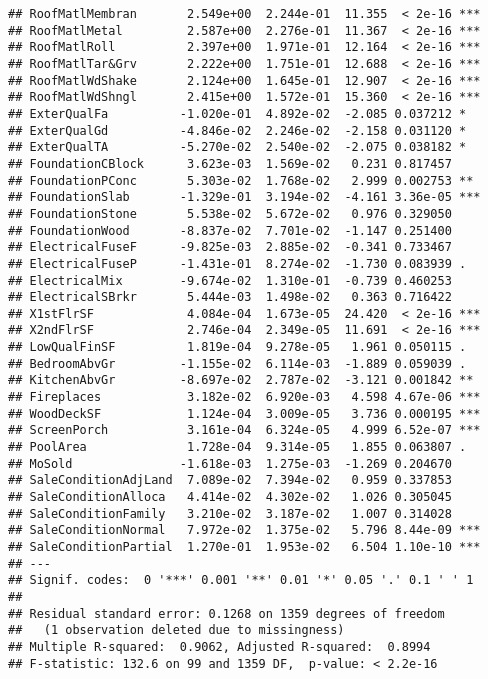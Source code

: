 \documentclass[
]{article}
\begin{document}
\begin{verbatim}
## RoofMatlMembran       2.549e+00  2.244e-01  11.355  < 2e-16 ***
## RoofMatlMetal         2.587e+00  2.276e-01  11.367  < 2e-16 ***
## RoofMatlRoll          2.397e+00  1.971e-01  12.164  < 2e-16 ***
## RoofMatlTar&Grv       2.222e+00  1.751e-01  12.688  < 2e-16 ***
## RoofMatlWdShake       2.124e+00  1.645e-01  12.907  < 2e-16 ***
## RoofMatlWdShngl       2.415e+00  1.572e-01  15.360  < 2e-16 ***
## ExterQualFa          -1.020e-01  4.892e-02  -2.085 0.037212 *  
## ExterQualGd          -4.846e-02  2.246e-02  -2.158 0.031120 *  
## ExterQualTA          -5.270e-02  2.540e-02  -2.075 0.038182 *  
## FoundationCBlock      3.623e-03  1.569e-02   0.231 0.817457    
## FoundationPConc       5.303e-02  1.768e-02   2.999 0.002753 ** 
## FoundationSlab       -1.329e-01  3.194e-02  -4.161 3.36e-05 ***
## FoundationStone       5.538e-02  5.672e-02   0.976 0.329050    
## FoundationWood       -8.837e-02  7.701e-02  -1.147 0.251400    
## ElectricalFuseF      -9.825e-03  2.885e-02  -0.341 0.733467    
## ElectricalFuseP      -1.431e-01  8.274e-02  -1.730 0.083939 .  
## ElectricalMix        -9.674e-02  1.310e-01  -0.739 0.460253    
## ElectricalSBrkr       5.444e-03  1.498e-02   0.363 0.716422    
## X1stFlrSF             4.084e-04  1.673e-05  24.420  < 2e-16 ***
## X2ndFlrSF             2.746e-04  2.349e-05  11.691  < 2e-16 ***
## LowQualFinSF          1.819e-04  9.278e-05   1.961 0.050115 .  
## BedroomAbvGr         -1.155e-02  6.114e-03  -1.889 0.059039 .  
## KitchenAbvGr         -8.697e-02  2.787e-02  -3.121 0.001842 ** 
## Fireplaces            3.182e-02  6.920e-03   4.598 4.67e-06 ***
## WoodDeckSF            1.124e-04  3.009e-05   3.736 0.000195 ***
## ScreenPorch           3.161e-04  6.324e-05   4.999 6.52e-07 ***
## PoolArea              1.728e-04  9.314e-05   1.855 0.063807 .  
## MoSold               -1.618e-03  1.275e-03  -1.269 0.204670    
## SaleConditionAdjLand  7.089e-02  7.394e-02   0.959 0.337853    
## SaleConditionAlloca   4.414e-02  4.302e-02   1.026 0.305045    
## SaleConditionFamily   3.210e-02  3.187e-02   1.007 0.314028    
## SaleConditionNormal   7.972e-02  1.375e-02   5.796 8.44e-09 ***
## SaleConditionPartial  1.270e-01  1.953e-02   6.504 1.10e-10 ***
## ---
## Signif. codes:  0 '***' 0.001 '**' 0.01 '*' 0.05 '.' 0.1 ' ' 1
## 
## Residual standard error: 0.1268 on 1359 degrees of freedom
##   (1 observation deleted due to missingness)
## Multiple R-squared:  0.9062, Adjusted R-squared:  0.8994 
## F-statistic: 132.6 on 99 and 1359 DF,  p-value: < 2.2e-16
\end{verbatim}
\end{document}
